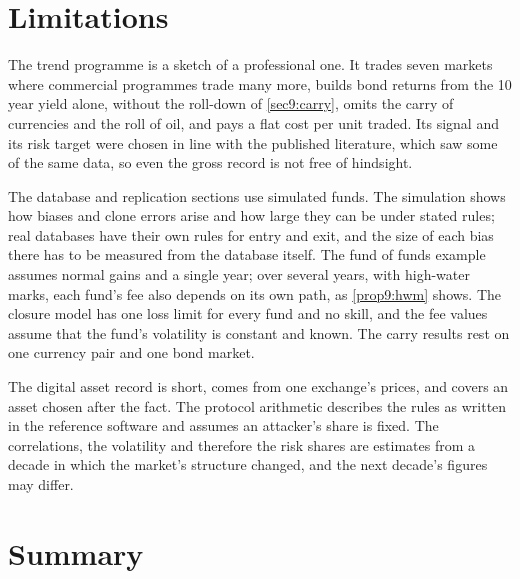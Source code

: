 \begin{chapterrefs}
\FloatBarrier
\section{Limitations}
\label{sec9:limits}

The trend programme is a sketch of a professional one. It trades seven markets where commercial
programmes trade many more, builds bond returns from the 10 year yield alone, without the roll-down
of \cref{sec9:carry}, omits the carry of currencies and the roll of oil, and pays a flat cost per unit
traded. Its signal and its risk target were chosen in line
with the published literature, which saw some of the same data, so even the gross record is not free of
hindsight.

The database and replication sections use simulated funds. The simulation shows how biases and
clone errors arise and how large they can be under stated rules; real databases have their own rules
for entry and exit, and the size of each bias there has to be measured from the database itself. The
fund of funds example assumes normal gains and a single year; over several years, with high-water
marks, each fund's fee also depends on its own path, as \cref{prop9:hwm} shows. The closure model has
one loss limit for every fund and no skill, and the fee values assume that the fund's volatility is
constant and known. The carry results rest on one currency pair and one bond market.

The digital asset record is short, comes from one exchange's prices, and covers an asset chosen after
the fact. The protocol arithmetic describes the rules as written in the reference software and
assumes an attacker's share is fixed. The correlations, the volatility and therefore the risk shares are estimates from a decade in
which the market's structure changed, and the next decade's figures may differ.

\FloatBarrier
\section{Summary}
\label{sec9:summary}


\end{chapterrefs}
